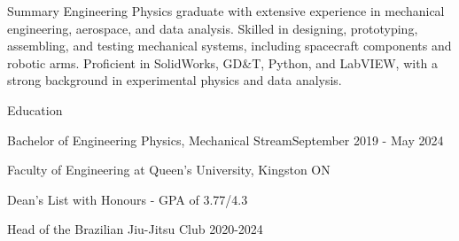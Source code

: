 \documentclass{resume} %
\begin{document}
\begin{rSection}{Summary}
Engineering Physics graduate with extensive experience in mechanical engineering, aerospace, and data analysis. Skilled in designing, prototyping, assembling, and testing mechanical systems, including spacecraft components and robotic arms. Proficient in SolidWorks, GD\&T, Python, and LabVIEW, with a strong background in experimental physics and data analysis.
\end{rSection}

\begin{rSection}{Education}

\begin{rSubsection}{Bachelor of Engineering Physics, Mechanical Stream}{September 2019 - May 2024}{}{}{}
  \item Faculty of Engineering at Queen's University, Kingston ON
  \item Dean's List with Honours - GPA of 3.77/4.3
  \item Head of the Brazilian Jiu-Jitsu Club 2020-2024
\end{rSubsection}

\end{rSection}

\end{document}
